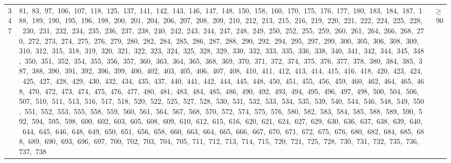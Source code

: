 \begin{longtable}{c|p{}|r}
347 & 81,\ 83,\ 97,\ 106,\ 107,\ 118,\ 125,\ 137,\ 141,\ 142,\ 143,\ 146,\ 147,\ 148,\ 150,\ 158,\ 160,\ 170,\ 175,\ 176,\ 177,\ 180,\ 183,\ 184,\ 187,\ 188,\ 189,\ 190,\ 195,\ 196,\ 198,\ 200,\ 201,\ 204,\ 206,\ 207,\ 208,\ 209,\ 210,\ 212,\ 213,\ 215,\ 216,\ 219,\ 220,\ 221,\ 222,\ 224,\ 225,\ 228,\ 230,\ 231,\ 232,\ 234,\ 235,\ 236,\ 237,\ 238,\ 240,\ 242,\ 243,\ 244,\ 247,\ 248,\ 249,\ 250,\ 252,\ 255,\ 259,\ 260,\ 261,\ 264,\ 266,\ 268,\ 270,\ 272,\ 273,\ 274,\ 275,\ 276,\ 279,\ 280,\ 282,\ 284,\ 285,\ 286,\ 287,\ 288,\ 290,\ 292,\ 294,\ 295,\ 297,\ 299,\ 300,\ 305,\ 306,\ 308,\ 309,\ 310,\ 312,\ 315,\ 318,\ 319,\ 320,\ 321,\ 322,\ 323,\ 324,\ 325,\ 328,\ 329,\ 330,\ 332,\ 333,\ 335,\ 336,\ 338,\ 340,\ 341,\ 342,\ 344,\ 345,\ 348,\ 350,\ 351,\ 352,\ 354,\ 355,\ 356,\ 357,\ 360,\ 363,\ 364,\ 365,\ 368,\ 369,\ 370,\ 371,\ 372,\ 374,\ 375,\ 376,\ 377,\ 378,\ 380,\ 384,\ 385,\ 387,\ 388,\ 390,\ 391,\ 392,\ 396,\ 399,\ 400,\ 402,\ 403,\ 405,\ 406,\ 407,\ 408,\ 410,\ 411,\ 412,\ 413,\ 414,\ 415,\ 416,\ 418,\ 420,\ 423,\ 424,\ 425,\ 427,\ 428,\ 429,\ 430,\ 432,\ 434,\ 435,\ 437,\ 440,\ 441,\ 442,\ 444,\ 445,\ 448,\ 450,\ 451,\ 455,\ 456,\ 459,\ 460,\ 462,\ 464,\ 465,\ 468,\ 470,\ 472,\ 473,\ 474,\ 475,\ 476,\ 477,\ 480,\ 481,\ 483,\ 484,\ 485,\ 486,\ 490,\ 492,\ 493,\ 494,\ 495,\ 496,\ 497,\ 498,\ 500,\ 504,\ 506,\ 507,\ 510,\ 511,\ 513,\ 516,\ 517,\ 518,\ 520,\ 522,\ 525,\ 527,\ 528,\ 530,\ 531,\ 532,\ 533,\ 534,\ 535,\ 539,\ 540,\ 544,\ 546,\ 548,\ 549,\ 550,\ 551,\ 552,\ 553,\ 555,\ 558,\ 559,\ 560,\ 561,\ 564,\ 567,\ 568,\ 570,\ 572,\ 574,\ 575,\ 576,\ 580,\ 582,\ 583,\ 584,\ 585,\ 588,\ 589,\ 590,\ 592,\ 594,\ 595,\ 598,\ 600,\ 602,\ 603,\ 605,\ 608,\ 609,\ 610,\ 612,\ 615,\ 616,\ 620,\ 621,\ 624,\ 627,\ 629,\ 630,\ 636,\ 637,\ 638,\ 639,\ 640,\ 644,\ 645,\ 646,\ 648,\ 649,\ 650,\ 651,\ 656,\ 658,\ 660,\ 663,\ 664,\ 665,\ 666,\ 667,\ 670,\ 671,\ 672,\ 675,\ 676,\ 680,\ 682,\ 684,\ 685,\ 688,\ 689,\ 690,\ 693,\ 696,\ 697,\ 700,\ 702,\ 703,\ 704,\ 705,\ 711,\ 712,\ 713,\ 714,\ 715,\ 720,\ 721,\ 725,\ 728,\ 730,\ 731,\ 732,\ 735,\ 736,\ 737,\ 738 & $\ge$ 90 \\

\end{longtable}
